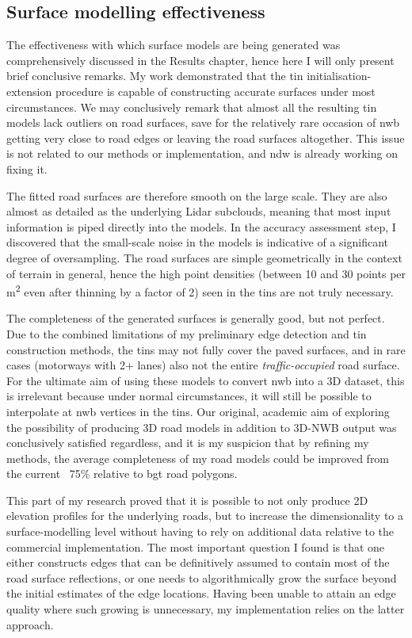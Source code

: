 \subsection{Surface modelling effectiveness}
\label{sub:effectivenessmodelling}

The effectiveness with which surface models are being generated was comprehensively discussed in the Results chapter, hence here I will only present brief conclusive remarks. My work demonstrated that the \ac{tin} initialisation-extension procedure is capable of constructing accurate surfaces under most circumstances. We may conclusively remark that almost all the resulting \ac{tin} models lack outliers on road surfaces, save for the relatively rare occasion of \ac{nwb} getting very close to road edges or leaving the road surfaces altogether. This issue is not related to our methods or implementation, and \ac{ndw} is already working on fixing it.

The fitted road surfaces are therefore smooth on the large scale. They are also almost as detailed as the underlying Lidar subclouds, meaning that most input information is piped directly into the models. In the accuracy assessment step, I discovered that the small-scale noise in the models is indicative of a significant degree of oversampling. The road surfaces are simple geometrically in the context of terrain in general, hence the high point densities (between 10 and 30 points per m\textsuperscript{2} even after thinning by a factor of 2) seen in the \ac{tin}s are not truly necessary.

The completeness of the generated surfaces is generally good, but not perfect. Due to the combined limitations of my preliminary edge detection and \ac{tin} construction methods, the \ac{tin}s may not fully cover the paved surfaces, and in rare cases (motorways with 2+ lanes) also not the entire \textit{traffic-occupied} road surface. For the ultimate aim of using these models to convert \ac{nwb} into a 3D dataset, this is irrelevant because under normal circumstances, it will still be possible to interpolate at \ac{nwb} vertices in the \ac{tin}s. Our original, academic aim of exploring the possibility of producing 3D road models in addition to 3D-NWB output was conclusively satisfied regardless, and it is my suspicion that by refining my methods, the average completeness of my road models could be improved from the current ~75\% relative to \ac{bgt} road polygons.

This part of my research proved that it is possible to not only produce 2D elevation profiles for the underlying roads, but to increase the dimensionality to a surface-modelling level without having to rely on additional data relative to the commercial implementation. The most important question I found is that one either constructs edges that can be definitively assumed to contain most of the road surface reflections, or one needs to algorithmically grow the surface beyond the initial estimates of the edge locations. Having been unable to attain an edge quality where such growing is unnecessary, my implementation relies on the latter approach.

